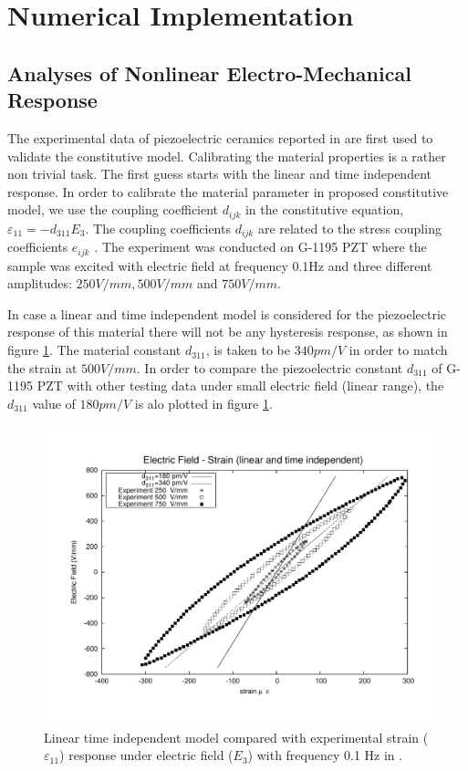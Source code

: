\section{Numerical Implementation}
\subsection{Analyses of Nonlinear Electro-Mechanical Response}
The experimental data of piezoelectric ceramics reported in \cite{Crawley1990} are first used to validate the constitutive model.
Calibrating the material properties is a rather non trivial task.
The first guess starts with the linear and time independent response.
In order to calibrate the material parameter in proposed constitutive model, we use the coupling coefficient $d_{ijk}$ in the constitutive equation, $\varepsilon_{11}=-d_{311}E_3$. 
The coupling coefficients $d_{ijk}$ are related to the stress coupling coefficients $e_{ijk}$ \cite{Leo2007}. 
The experiment was conducted on G-1195 PZT where the sample was excited with electric field at frequency 0.1Hz and three different amplitudes: $250 V/mm, 500 V/mm$ and $750 V/mm$.


In case a linear and time independent model is considered for the piezoelectric response of this material there will not be any hysteresis response, as shown in figure \ref{fig:Crawley_xp_TimeinDepenLin}. 
The material constant $d_{311}$, is taken to be $340 pm/V$ in order to match the strain at $500 V/mm$. 
In order to compare the piezoelectric constant $d_{311}$ of G-1195 PZT with other testing data under small electric field (linear range), the $d_{311}$ value of $180 pm/V$ \cite{low1995modeling} is alo plotted in figure \ref{fig:Crawley_xp_TimeinDepenLin}.

\begin{figure} 
\centering 
\includegraphics[width=5.0in]{./chap_3_minor_loop/figures/crawley_linear_time_independent.pdf}
\caption{Linear time independent model compared with experimental strain ($\varepsilon_{11}$) response under electric field ($E_3$) with frequency 0.1 Hz in \cite{Crawley1990}.}
\label{fig:Crawley_xp_TimeinDepenLin}
\end{figure}
 
